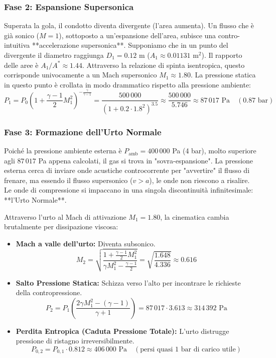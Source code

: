 \documentclass[11pt,a4paper]{article}
\begin{document}
\subsubsection{Fase 2: Espansione Supersonica}
Superata la gola, il condotto diventa divergente (l'area aumenta). Un flusso che è già sonico ($M=1$), sottoposto a un'espansione dell'area, subisce una contro-intuitiva **accelerazione supersonica**. 
Supponiamo che in un punto del divergente il diametro raggiunga $D_1 = 0.12$ m ($A_1 \approx 0.01131 \text{ m}^2$).
Il rapporto delle aree è $A_1 / A^* \approx 1.44$. Attraverso la relazione di spinta isentropica, questo corrisponde univocamente a un Mach supersonico $M_1 \approx 1.80$.
La pressione statica in questo punto è crollata in modo drammatico rispetto alla pressione ambiente:
\begin{equation}
    P_1 = P_0 \left( 1 + \frac{\gamma-1}{2} M_1^2 \right)^{-\frac{\gamma}{\gamma-1}} = \frac{500\,000}{(1 + 0.2 \cdot 1.8^2)^{3.5}} \approx \frac{500\,000}{5.746} \approx 87\,017 \text{ Pa} \quad (0.87 \text{ bar})
\end{equation}

\subsubsection{Fase 3: Formazione dell'Urto Normale}
Poiché la pressione ambiente esterna è $P_{\text{amb}} = 400\,000$ Pa (4 bar), molto superiore agli $87\,017$ Pa appena calcolati, il gas si trova in "sovra-espansione". La pressione esterna cerca di inviare onde acustiche controcorrente per "avvertire" il flusso di frenare, ma essendo il flusso supersonico ($v > a$), le onde non riescono a risalire.
Le onde di compressione si impaccano in una singola discontinuità infinitesimale: **l'Urto Normale**.

Attraverso l'urto al Mach di attivazione $M_1 = 1.80$, la cinematica cambia brutalmente per dissipazione viscosa:
\begin{itemize}
    \item \textbf{Mach a valle dell'urto:} Diventa subsonico.
    \begin{equation}
        M_2 = \sqrt{\frac{1 + \frac{\gamma-1}{2} M_1^2}{\gamma M_1^2 - \frac{\gamma-1}{2}}} = \sqrt{\frac{1.648}{4.336}} \approx 0.616
    \end{equation}
    \item \textbf{Salto Pressione Statica:} Schizza verso l'alto per incontrare le richieste della contropressione.
    \begin{equation}
        P_2 = P_1 \left( \frac{2\gamma M_1^2 - (\gamma-1)}{\gamma+1} \right) = 87\,017 \cdot 3.613 \approx 314\,392 \text{ Pa}
    \end{equation}
    \item \textbf{Perdita Entropica (Caduta Pressione Totale):} L'urto distrugge pressione di ristagno irreversibilmente.
    \begin{equation}
        P_{0,2} = P_{0,1} \cdot 0.812 \approx 406\,000 \text{ Pa} \quad (\text{persi quasi 1 bar di carico utile})
    \end{equation}
\end{itemize}
\end{document}
